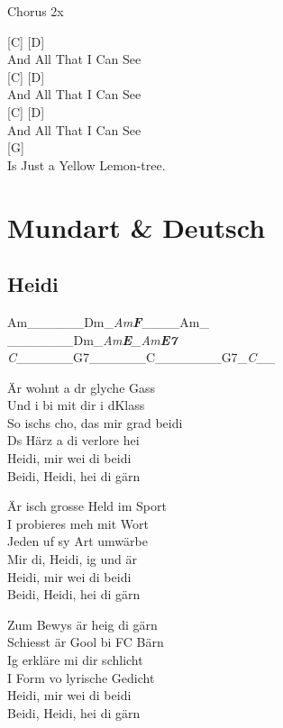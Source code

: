 \documentclass[
  letterpaper,
]{scrbook}
\begin{document}
Chorus 2x

{[}C{]} {[}D{]}\\
And All That I Can See\\
{[}C{]} {[}D{]}\\
And All That I Can See\\
{[}C{]} {[}D{]}\\
And All That I Can See\\
{[}G{]}\\
Is Just a Yellow Lemon-tree.

\part{Mundart \& Deutsch}

\hypertarget{heidi}{%
\chapter{Heidi}\label{heidi}}

\textbar Am\_\_\_\_\_\_\textbar Dm\_\emph{Am\textbf{\textbar{}F}}\textbar\_\_\_\_Am\_\emph{\textbar{}\\
\textbar{}}\_\_\_\_\_\_\_\textbar Dm\_\emph{Am\textbf{\textbar E}\_Am\textbf{\textbar{}E7}\textbar{}\\
\textbar C}\_\_\_\_\_\_\textbar G7\_\_\_\_\_\_\textbar C\_\_\_\_\_\_\_\textbar G7\_\emph{C}\_\_\textbar{}

Är wohnt a dr glyche Gass\\
Und i bi mit dir i d\textquotesingle Klass\\
So ischs cho, das mir grad beidi\\
Ds Härz a di verlore hei\\
Heidi, mir wei di beidi\\
Beidi, Heidi, hei di gärn

Är isch grosse Held im Sport\\
I probieres meh mit Wort\\
Jeden uf sy Art umwärbe\\
Mir di, Heidi, ig und är\\
Heidi, mir wei di beidi\\
Beidi, Heidi, hei di gärn

Zum Bewys är heig di gärn\\
Schiesst är Gool bi FC Bärn\\
Ig erkläre mi dir schlicht\\
I Form vo lyrische Gedicht\\
Heidi, mir wei di beidi\\
Beidi, Heidi, hei di gärn
\end{document}
